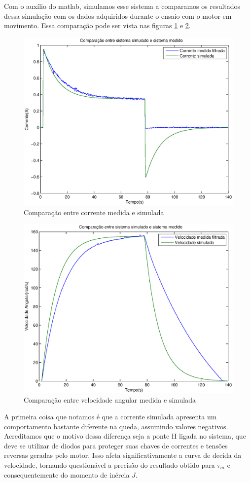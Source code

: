 \documentclass{article}
\begin{document}
Com o auxílio do matlab, simulamos esse sistema a comparamos os resultados dessa simulação com os dados adquiridos durante o ensaio com o motor em movimento. Essa comparação pode ser vista nas figuras \ref{fig:simi} e \ref{fig:simv}.
\begin{figure}[H]
	\centering
	\includegraphics[width=0.8\linewidth]{../simi}
	\caption{Comparação entre corrente medida e simulada}
	\label{fig:simi}
\end{figure}
\begin{figure}[H]
	\centering
	\includegraphics[width=0.8\linewidth]{../simv}
	\caption{Comparação entre velocidade angular medida e simulada}
	\label{fig:simv}
\end{figure}

A primeira coisa que notamos é que a corrente simulada apresenta um comportamento bastante diferente na queda, assumindo valores negativos. Acreditamos que o motivo dessa diferença seja a ponte H ligada no sistema, que deve se utilizar de diodos para proteger suas chaves de correntes e tensões reversas geradas pelo motor. Isso afeta significativamente a curva de decida da velocidade, tornando questionável a precisão do resultado obtido para $\tau_m$ e consequentemente do momento de inércia $J$.
\end{document}

